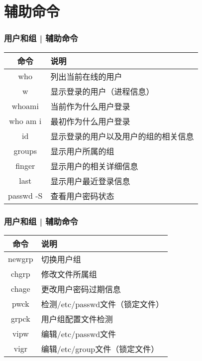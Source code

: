 \section{辅助命令}
\begin{frame}
  \frametitle{用户和组 | \alert{辅助命令}}
  \begin{table}
    \centering
    \begin{tabular}{cl}
      \hline
      \rowcolor{blue!50}命令 & 说明\\
      \hline
      who & 列出当前在线的用户\\
      w & 显示登录的用户（进程信息）\\
      \alert{whoami} & 当前作为什么用户登录\\
      \alert{who am i} & 最初作为什么用户登录\\
      id & 显示登录的用户以及用户的组的相关信息\\
      groups & 显示用户所属的组\\
      finger & 显示用户的相关详细信息\\
      \alert{last} & 显示用户最近登录信息\\
      passwd -S & 查看用户密码状态\\
      \hline
    \end{tabular}
  \end{table}
\end{frame}

\begin{frame}
  \frametitle{用户和组 | 辅助命令}
  \begin{table}
    \centering
    \begin{tabular}{cl}
      \hline
      \rowcolor{blue!50}命令 & 说明\\
      \hline
      newgrp & 切换用户组\\
      chgrp & 修改文件所属组\\
      chage & 更改用户密码过期信息\\
      \hline
      pwck & 检测/etc/passwd文件（锁定文件）\\
      grpck & 用户组配置文件检测\\
      vipw & 编辑/etc/passwd文件\\
      vigr & 编辑/etc/group文件（锁定文件）\\
      \hline
    \end{tabular}
  \end{table}
\end{frame}

